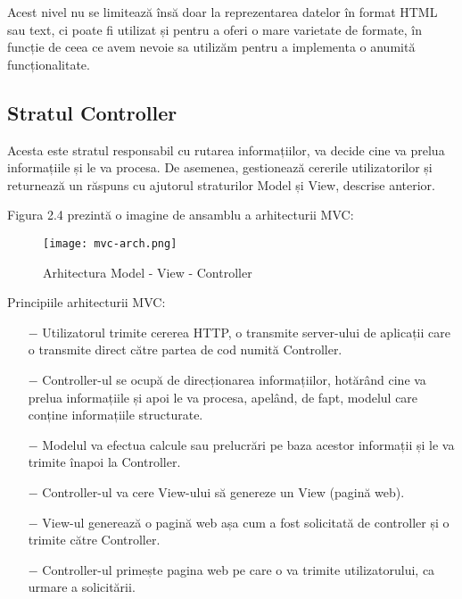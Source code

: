 Acest nivel nu se limitează însă doar la reprezentarea datelor în format HTML sau text, ci poate fi utilizat și pentru a oferi o mare varietate de formate, în funcție de ceea ce avem nevoie sa utilizăm pentru a implementa o anumită funcționalitate.

\subsection{Stratul Controller}
Acesta este stratul responsabil cu rutarea informațiilor, va decide cine va prelua informațiile și le va procesa. De asemenea, gestionează cererile utilizatorilor și returnează un răspuns cu ajutorul straturilor Model și View, descrise anterior.\newline

Figura 2.4 prezintă o imagine de ansamblu a arhitecturii MVC:\newline

\begin{figure}[H]
	\begin{center}
		\texttt{[image: mvc-arch.png]}
		\caption{Arhitectura Model - View - Controller}
	\end{center}
\end{figure}

Principiile arhitecturii MVC:

\begin{itemize}
	\addtolength{\itemindent}{1cm}
	\item[$-$]Utilizatorul trimite cererea HTTP, o transmite server-ului de aplicații care o transmite direct către partea de cod numită Controller.
	\item[$-$]Controller-ul se ocupă de direcționarea informațiilor, hotărând cine va prelua informațiile și apoi le va procesa, apelând, de fapt, modelul care conține informațiile structurate.
	\item[$-$]Modelul va efectua calcule sau prelucrări pe baza acestor informații și le va trimite înapoi la Controller.
	\item[$-$]Controller-ul va cere View-ului să genereze un View (pagină web).
	\item[$-$]View-ul generează o pagină web așa cum a fost solicitată de controller și o trimite către Controller.
	\item[$-$]Controller-ul primește pagina web pe care o va trimite utilizatorului, ca urmare a solicitării.
	\newline
\end{itemize}

